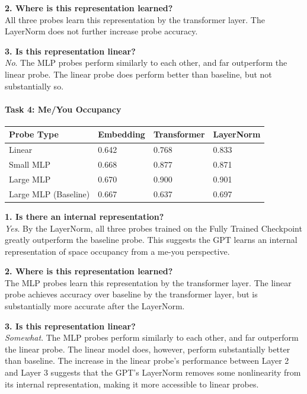 \documentclass[11pt]{article}
\begin{document}
\textbf{2. Where is this representation learned?}\\
All three probes learn this representation by the transformer layer. The
LayerNorm does not further increase probe accuracy.

\textbf{3. Is this representation linear?}\\
\emph{No}. The MLP probes perform similarly to each other, and far
outperform the linear probe. The linear probe does perform better than
baseline, but not substantially so.

    \paragraph{Task 4: Me/You Occupancy}\label{task-4-meyou-occupancy}

\begin{longtable}[]{@{}llll@{}}
\toprule\noalign{}
Probe Type & Embedding & Transformer & LayerNorm \\
\midrule\noalign{}
\endhead
\bottomrule\noalign{}
\endlastfoot
Linear & 0.642 & 0.768 & 0.833 \\
Small MLP & 0.668 & 0.877 & 0.871 \\
Large MLP & 0.670 & 0.900 & 0.901 \\
Large MLP (Baseline) & 0.667 & 0.637 & 0.697 \\
\end{longtable}

\textbf{1. Is there an internal representation?}\\
\emph{Yes}. By the LayerNorm, all three probes trained on the Fully
Trained Checkpoint greatly outperform the baseline probe. This suggests
the GPT learns an internal representation of space occupancy from a
me-you perspective.

\textbf{2. Where is this representation learned?}\\
The MLP probes learn this representation by the transformer layer. The
linear probe achieves accuracy over baseline by the transformer layer,
but is substantially more accurate after the LayerNorm.

\textbf{3. Is this representation linear?}\\
\emph{Somewhat}. The MLP probes perform similarly to each other, and far
outperform the linear probe. The linear model does, however, perform
substantially better than baseline. The increase in the linear probe's
performance between Layer 2 and Layer 3 suggests that the GPT's
LayerNorm removes some nonlinearity from its internal representation,
making it more accessible to linear probes.
\end{document}
